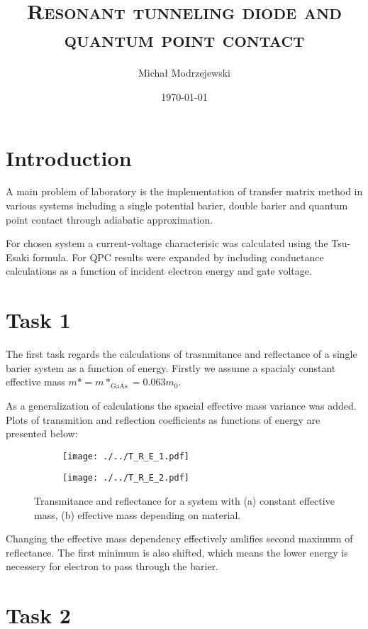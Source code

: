 \documentclass[a4paper,12pt]{article}
\author{Michał Modrzejewski}
\date{\today}
\title{\textsc{Resonant tunneling diode and quantum point contact}}
\begin{document}
	\maketitle
	
	\section*{Introduction}
	A main problem of laboratory is the implementation of transfer matrix method in various systems including a single potential barier, double barier and quantum point contact through adiabatic approximation.
	
	For chosen system a current-voltage characterisic was calculated using the Tsu-Esaki formula. For QPC results were expanded by including conductance calculations as a function of incident electron energy and gate voltage.
	
	\section*{Task 1}
	The first task regards the calculations of trasnmitance and reflectance of a single barier system as a function of energy. Firstly we assume a spacialy constant effective mass $ m* = m*_{\mathrm{GaAs}} = 0.063 m_0$.
	
	As a generalization of calculations the spacial effective mass variance was added. Plots of transmition and reflection coefficients as functions of energy are presented below:
	
	\begin{figure}[H]
		\begin{subfigure}{.5\textwidth}
			\texttt{[image: ./../T\_R\_E\_1.pdf]}
			\caption{}
		\end{subfigure}
		\begin{subfigure}{.5\textwidth}
			\texttt{[image: ./../T\_R\_E\_2.pdf]}
			\caption{}
		\end{subfigure}
		\caption{Transmitance and reflectance for a system with (a) constant effective mass, (b) effective mass depending on material.}
	\end{figure}

	Changing the effective mass dependency effectively amlifies second maximum of reflectance. The first minimum is also shifted, which means the lower energy is necessery for electron to pass through the barier.
	
	\section*{Task 2}
	
\end{document}
